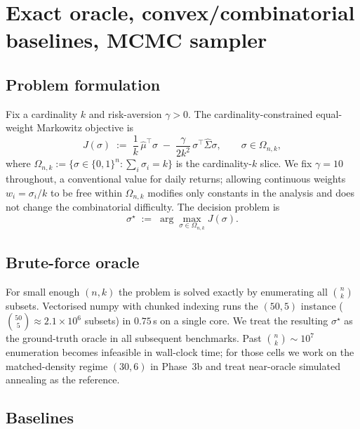 
\section{Exact oracle, convex/combinatorial baselines, MCMC sampler}\label{sec:oracle}

\subsection{Problem formulation}\label{ssec:formulation}

Fix a cardinality $k$ and risk-aversion $\gamma>0$. The cardinality-constrained
equal-weight Markowitz objective is
\begin{equation}\label{eq:Jdef}
  J(\sigma) \;:=\; \frac{1}{k}\, \hat\mu^\top\sigma \;-\; \frac{\gamma}{2 k^2}\,\sigma^\top
  \hat\Sigma\sigma, \qquad \sigma\in\Omega_{n,k},
\end{equation}
where $\Omega_{n,k} := \{\sigma\in\{0,1\}^n : \sum_i\sigma_i = k\}$ is the cardinality-$k$
slice. We fix $\gamma=10$ throughout, a conventional value for daily returns;
allowing continuous weights $w_i = \sigma_i/k$ to be free
within $\Omega_{n,k}$ modifies only constants in the analysis and does not change the
combinatorial difficulty. The decision problem is
\begin{equation}\label{eq:problem}
  \sigma^\star \;:=\; \arg\max_{\sigma\in\Omega_{n,k}} J(\sigma).
\end{equation}

\subsection{Brute-force oracle}\label{ssec:oracle}

For small enough $(n,k)$ the problem is solved exactly by enumerating all
$\binom{n}{k}$ subsets. Vectorised numpy with chunked indexing runs the
$(50,5)$ instance ($\binom{50}{5}\approx 2.1\times 10^6$ subsets) in $0.75$\,s on a
single core. We treat the resulting $\sigma^\star$ as the ground-truth oracle in
all subsequent benchmarks. Past $\binom{n}{k}\sim 10^7$ enumeration becomes infeasible
in wall-clock time; for those cells we work on the matched-density regime $(30,6)$ in
Phase~3b and treat near-oracle simulated annealing as the reference.

\subsection{Baselines}\label{sec:lasso}


